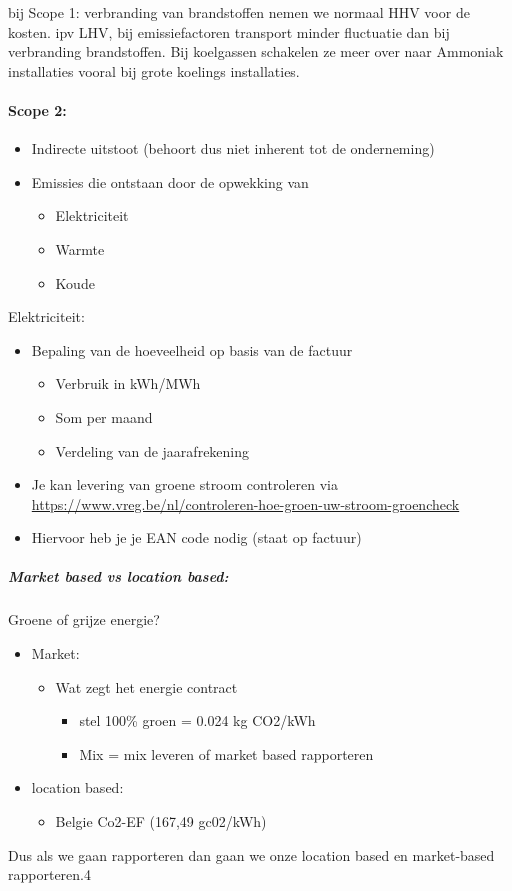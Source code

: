 \documentclass[12pt]{article}
\begin{document}
bij Scope 1: verbranding van brandstoffen nemen we normaal HHV voor de kosten. ipv LHV, bij emissiefactoren transport minder fluctuatie dan bij verbranding brandstoffen. Bij koelgassen schakelen ze meer over naar Ammoniak installaties vooral bij grote koelings installaties.
\paragraph{Scope 2:}
\begin{itemize}
    \item Indirecte uitstoot (behoort dus niet inherent tot de onderneming)
    \item Emissies die ontstaan door de opwekking van\begin{itemize}
        \item Elektriciteit 
        \item Warmte 
        \item Koude
    \end{itemize}
\end{itemize}
Elektriciteit:\begin{itemize}
    \item Bepaling van de hoeveelheid op basis van de factuur\begin{itemize}
        \item Verbruik in kWh/MWh
        \item Som per maand
        \item Verdeling van de jaarafrekening
    \end{itemize}
    \item Je kan levering van groene stroom controleren via \url{https://www.vreg.be/nl/controleren-hoe-groen-uw-stroom-groencheck} 
    \item Hiervoor heb je je EAN code nodig (staat op factuur)
\end{itemize}
\subparagraph{Market based vs location based:}
Groene of grijze energie?
\begin{itemize}
    \item Market:\begin{itemize}
        \item Wat zegt het energie contract\begin{itemize}
            \item stel 100\% groen = 0.024 kg CO2/kWh 
            \item Mix = mix leveren of market based rapporteren
        \end{itemize}
    \end{itemize}
    \item location based:\begin{itemize}
        \item Belgie Co2-EF (167,49 gc02/kWh)
    \end{itemize}
\end{itemize}
Dus als we gaan rapporteren dan gaan we onze location based en market-based rapporteren.4
\end{document}
